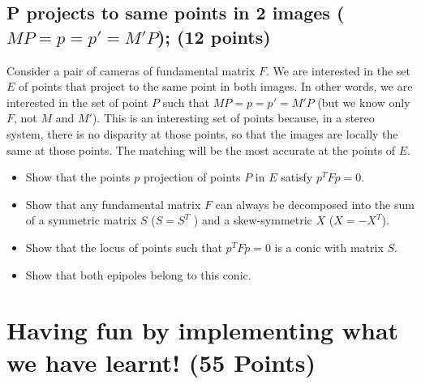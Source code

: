 \documentclass[11pt]{article}
\begin{document}
\subsection{P projects to same points in 2 images ($MP = p = p' = M'P$); (12 points)}
Consider a pair of cameras of fundamental matrix $F$. We are interested in the set $E$ of points that project to the same point in both images. In other words, we are interested in the set of point $P$ such that $MP = p = p' = M'P$ (but we know only $F$, not $M$ and $M'$). This is an interesting set of points because, in a stereo system, there is no disparity at those points, so that the images are locally the same at those points. The matching will be the most accurate at the points of $E$.
\begin{itemize}
\item Show that the points $p$ projection of points $P$ in $E$ satisfy $p^TFp = 0$.
\item Show that any fundamental matrix $F$ can always be decomposed into the sum of a symmetric matrix $S$ ($S = S^T$ ) and a skew-symmetric $X$
($X = -X^T$).
\item Show that the locus of points such that $p^TFp = 0$ is a conic with matrix $S$.
\item Show that both epipoles belong to this conic.
\end{itemize}


\section{Having fun by implementing what we have learnt! (55 Points)}
\end{document}
